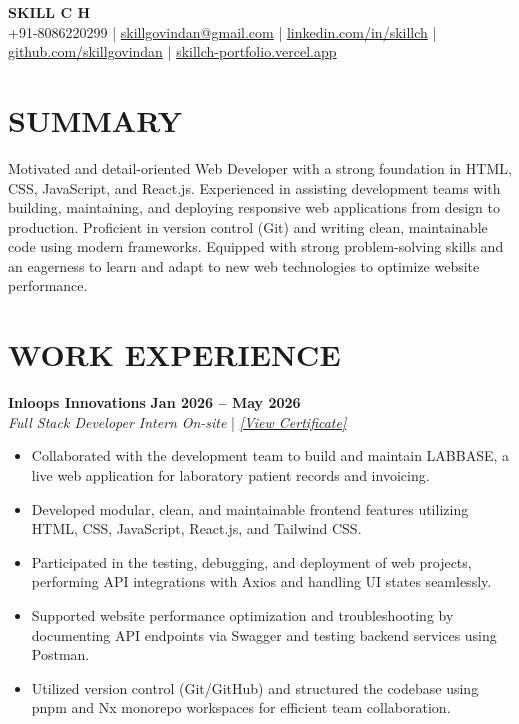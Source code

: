 \documentclass[a4paper,10pt]{article}
\begin{document}
\begin{center}
    {\Large \textbf{SKILL C H}}\\[2pt]
    +91-8086220299 \;|\;
    \href{mailto:skillgovindan@gmail.com}{skillgovindan@gmail.com} \;|\;
    \href{https://www.linkedin.com/in/skillch}{linkedin.com/in/skillch} \;|\;
    \href{https://github.com/skillgovindan}{github.com/skillgovindan} \;|\;
    \href{https://skillch-portfolio.vercel.app}{skillch-portfolio.vercel.app}
\end{center}

\vspace{2pt}

\section*{SUMMARY}
Motivated and detail-oriented Web Developer with a strong foundation in HTML, CSS, JavaScript, and React.js. Experienced in assisting development teams with building, maintaining, and deploying responsive web applications from design to production. Proficient in version control (Git) and writing clean, maintainable code using modern frameworks. Equipped with strong problem-solving skills and an eagerness to learn and adapt to new web technologies to optimize website performance.

\section*{WORK EXPERIENCE}
\textbf{Inloops Innovations} \hfill \textbf{Jan 2026 -- May 2026}\\
\textit{Full Stack Developer Intern} \hfill \textit{On-site} \;|\; \href{https://drive.google.com/file/d/1n9394Dv4NRJwG4wwP0ynPJKg9biZELcR/view?usp=drive_link}{\textit{[View Certificate]}}
\begin{itemize}
    \item Collaborated with the development team to build and maintain LABBASE, a live web application for laboratory patient records and invoicing.
    \item Developed modular, clean, and maintainable frontend features utilizing HTML, CSS, JavaScript, React.js, and Tailwind CSS.
    \item Participated in the testing, debugging, and deployment of web projects, performing API integrations with Axios and handling UI states seamlessly.
    \item Supported website performance optimization and troubleshooting by documenting API endpoints via Swagger and testing backend services using Postman.
    \item Utilized version control (Git/GitHub) and structured the codebase using pnpm and Nx monorepo workspaces for efficient team collaboration.
\end{itemize}
\end{document}
